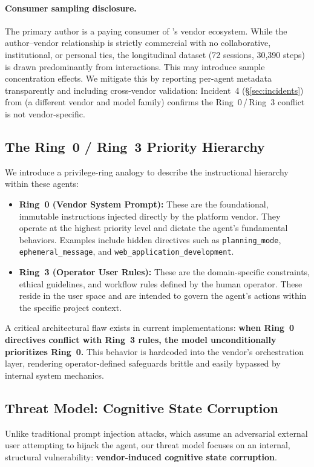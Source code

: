 \paragraph{Consumer sampling disclosure.}
The primary author is a paying consumer of \cortex{}'s vendor ecosystem. While the author--vendor relationship is strictly commercial with no collaborative, institutional, or personal ties, the longitudinal dataset (72 sessions, 30,390 steps) is drawn predominantly from \cortex{} interactions. This may introduce sample concentration effects. We mitigate this by reporting per-agent metadata transparently and including cross-vendor validation: Incident~4 (\S\ref{sec:incidents}) from \statsig{} (a different vendor and model family) confirms the Ring~0\,/\,Ring~3 conflict is not vendor-specific.

\subsection{The Ring~0 / Ring~3 Priority Hierarchy}
We introduce a privilege-ring analogy to describe the instructional hierarchy within these agents:

\begin{itemize}
    \item \textbf{Ring~0 (Vendor System Prompt):} These are the foundational, immutable instructions injected directly by the platform vendor. They operate at the highest priority level and dictate the agent's fundamental behaviors. Examples include hidden directives such as \texttt{planning\_mode}, \texttt{ephemeral\_message}, and \texttt{web\_application\_development}.
    \item \textbf{Ring~3 (Operator User Rules):} These are the domain-specific constraints, ethical guidelines, and workflow rules defined by the human operator. These reside in the user space and are intended to govern the agent's actions within the specific project context.
\end{itemize}

A critical architectural flaw exists in current implementations: \textbf{when Ring~0 directives conflict with Ring~3 rules, the model unconditionally prioritizes Ring~0.} This behavior is hardcoded into the vendor's orchestration layer, rendering operator-defined safeguards brittle and easily bypassed by internal system mechanics.

\subsection{Threat Model: Cognitive State Corruption}
Unlike traditional prompt injection attacks, which assume an adversarial external user attempting to hijack the agent, our threat model focuses on an internal, structural vulnerability: \textbf{vendor-induced cognitive state corruption}.

